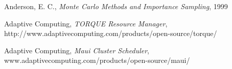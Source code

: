 \begin{thebibliography}{9}
    Anderson, E. C.,
    \emph{Monte Carlo Methods and Importance Sampling},
    1999

    Adaptive Computing,
    \emph{TORQUE Resource Manager},
    http://www.adaptivecomputing.com/products/open-source/torque/

    Adaptive Computing,
    \emph{Maui Cluster Scheduler},
    www.adaptivecomputing.com/products/open-source/maui/




\end{thebibliography}
